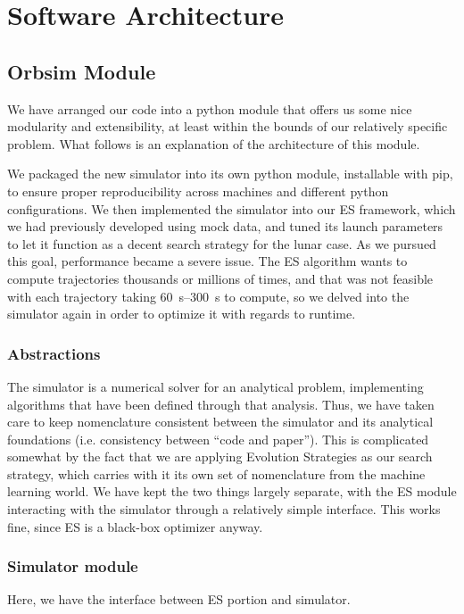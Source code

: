 \section{Software Architecture}
\subsection{Orbsim Module}
We have arranged our code into a python module that offers us some nice modularity and extensibility, at least within the bounds of our relatively specific problem. What follows is an explanation of the architecture of this module.

We packaged the new simulator into its own python module, installable with pip, to ensure proper reproducibility across machines and different python configurations. We then implemented the simulator into our ES framework, which we had previously developed using mock data, and tuned its launch parameters to let it function as a decent search strategy for the lunar case. As we pursued this goal, performance became a severe issue. The ES algorithm wants to compute trajectories thousands or millions of times, and that was not feasible with each trajectory taking \SIrange{60}{300}{\second} to compute, so we delved into the simulator again in order to optimize it with regards to runtime.

\subsubsection{Abstractions}

The simulator is a numerical solver for an analytical problem, implementing algorithms that have been defined through that analysis. Thus, we have taken care to keep nomenclature consistent between the simulator and its analytical foundations (i.e. consistency between ``code and paper''). This is complicated somewhat by the fact that we are applying Evolution Strategies as our search strategy, which carries with it its own set of nomenclature from the machine learning world. We have kept the two things largely separate, with the ES module interacting with the simulator through a relatively simple interface. This works fine, since ES is a black-box optimizer anyway.

\subsubsection{Simulator module}

Here, we have the interface between ES portion and simulator.

